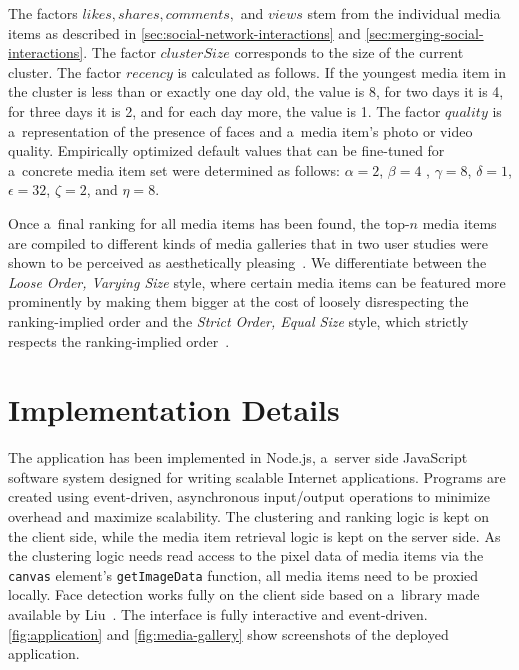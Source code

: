 \documentclass{sig-alt-release2}
\begin{document}
The factors $ \mathit{likes}, \mathit{shares}, \mathit{comments},$ and $ \mathit{views} $
stem from the individual media items as described in \autoref{sec:social-network-interactions}
and \autoref{sec:merging-social-interactions}.
The factor $ \mathit{clusterSize} $ corresponds to the size of the current cluster. 
The factor $ \mathit{recency} $ is calculated as follows.
If the youngest media item in the cluster is less than or exactly one day old,
the value is 8, for two days it is 4, for three days it is 2,
and for each day more, the value is 1.
The factor $ \mathit{quality} $ is a~representation of the
presence of faces and a~media item’s photo or video quality.
Empirically optimized default values
that can be fine-tuned for a~concrete media item set
were determined as follows:
$ \alpha = 2 $, $ \beta = 4 $ , $ \gamma = 8 $, $ \delta = 1 $,
$ \epsilon = 32 $, $ \zeta = 2 $, and $ \eta = 8 $.

Once a~final ranking for all media items has been found,
the top-$n$ media items are compiled to different kinds of media galleries
that in two user studies were shown to be perceived as
aesthetically pleasing~\cite{steiner2013mediagalleries}.
We differentiate between the \emph{Loose Order, Varying Size} style,
where certain media items can be featured more prominently by making them bigger
at the cost of loosely disrespecting the ranking-implied order
and the \emph{Strict Order, Equal Size} style,
which strictly respects the ranking-implied order~\cite{steiner2013mediagalleries}.
\\

\section{Implementation Details}

The application has been implemented in Node.js,
a~server side JavaScript software system
designed for writing scalable Internet applications.
Programs are created using event-driven, asynchronous input/output operations
to minimize overhead and maximize scalability.
The clustering and ranking logic is kept on the client side,
while the media item retrieval logic is kept on the server side.
As the clustering logic needs read access to the pixel data of media items via
the \texttt{canvas} element’s \texttt{getImageData} function,
all media items need to be proxied locally.
Face detection works fully on the client side based on a~library
made available by Liu~\cite{liu2012facedetection}.
The interface is fully interactive and event-driven.
\autoref{fig:application} and \autoref{fig:media-gallery} show screenshots
of the deployed application.
\end{document}
